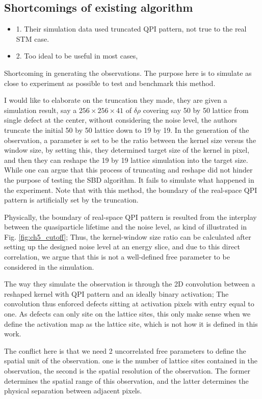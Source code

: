  
\subsection{Shortcomings of existing algorithm}
\begin{itemize}
	\item 1. Their simulation data used truncated QPI pattern, not true to the real STM case. 
	\item 2. Too ideal to be useful in most cases,
\end{itemize}

Shortcoming in generating the observations. The purpose here is to simulate as close to experiment as possible to test and benchmark this method. 

I would like to elaborate on the truncation they made, they are given a simulation result, say a $256\times256\times41$ of $\delta\rho$ covering say 50 by 50 lattice from single defect at the center, without considering the noise level, the authors truncate the initial 50 by 50 lattice down to 19 by 19. In the generation of the observation, a parameter is set to be the ratio between the kernel size versus the window size, by setting this, they determined target size of the kernel in pixel, and then they can reshape the 19 by 19 lattice simulation into the target size. While one can argue that this process of truncating and reshape did not hinder the purpose of testing the SBD algorithm. It fails to simulate what happened in the experiment. Note that with this method, the boundary of the real-space QPI pattern is artificially set by the truncation.

Physically, the boundary of real-space QPI pattern is resulted from the interplay between the quasiparticle lifetime and the noise level, as kind of illustrated in Fig. \ref{fig:ch5_cutoff}; Thus, the kernel-window size ratio can be calculated after setting up the designed noise level at an energy slice, and due to this direct correlation, we argue that this is not a well-defined free parameter to be considered in the simulation. 

The way they simulate the observation is through the 2D convolution between a reshaped kernel with QPI pattern and an ideally binary activation; The convolution thus enforced defects sitting at activation pixels with entry equal to one. As defects can only site on the lattice sites, this only make sense when we define the activation map as the lattice site, which is not how it is defined in this work. 

The conflict here is that we need 2 uncorrelated free parameters to define the spatial unit of the observation. one is the number of lattice sites contained in the observation, the second is the spatial resolution of the observation. The former determines the spatial range of this observation, and the latter determines the physical separation between adjacent pixels. 

